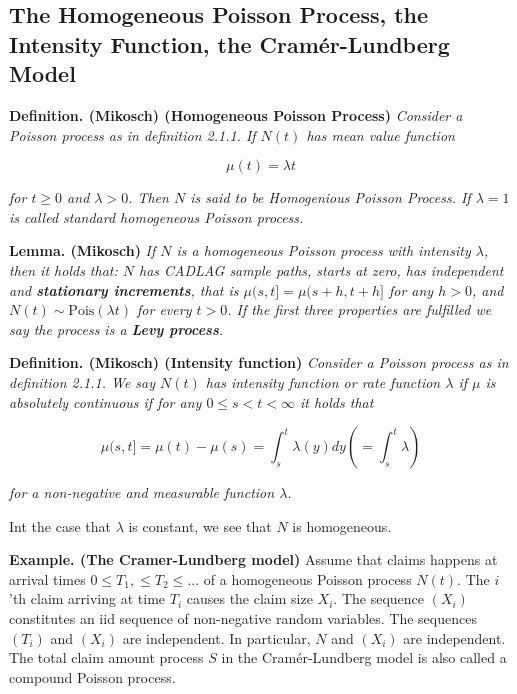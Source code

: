 \documentclass[a4paper,10pt,openany]{book}
\begin{document}
\hypertarget{the-homogeneous-poisson-process-the-intensity-function-the-cramuxe9r-lundberg-model}{%
\subsection{The Homogeneous Poisson Process, the Intensity Function, the Cramér-Lundberg Model}\label{the-homogeneous-poisson-process-the-intensity-function-the-cramuxe9r-lundberg-model}}

\textbf{Definition. (Mikosch) (Homogeneous Poisson Process)} \emph{Consider a Poisson process as in definition 2.1.1. If \(N(t)\) has mean value function}

\[
\mu(t)=\lambda t
\]

\emph{for \(t\ge 0\) and \(\lambda >0\). Then \(N\) is said to be Homogenious Poisson Process. If \(\lambda=1\) is called standard homogeneous Poisson process.}

\textbf{Lemma. (Mikosch)} \emph{If \(N\) is a homogeneous Poisson process with intensity \(\lambda\), then it holds that: \(N\) has CADLAG sample paths, starts at zero, has independent and \textbf{stationary increments}, that is \(\mu(s,t]=\mu(s+h,t+h]\) for any \(h>0\), and \(N(t)\sim \text{Pois}(\lambda t)\) for every \(t>0\). If the first three properties are fulfilled we say the process is a \textbf{Levy process}.}

\textbf{Definition. (Mikosch) (Intensity function)} \emph{Consider a Poisson process as in definition 2.1.1. We say \(N(t)\) has intensity function or rate function \(\lambda\) if \(\mu\) is absolutely continuous if for any \(0\le s <t<\infty\) it holds that}

\[
\mu(s,t]=\mu(t)-\mu(s)=\int^t_s\lambda(y) dy\left(=\int_s^t \lambda\right)
\]

\emph{for a non-negative and measurable function \(\lambda\).}

Int the case that \(\lambda\) is constant, we see that \(N\) is homogeneous.

\textbf{Example. (The Cramer-Lundberg model)} Assume that claims happens at arrival times \(0\le T_1,\le T_2\le ...\) of a homogeneous Poisson process \(N(t)\). The \(i\)'th claim arriving at time \(T_i\) causes the claim size \(X_i\). The sequence \((X_i)\) constitutes an iid sequence of non-negative random variables. The sequences \((T_i)\) and \((X_i)\) are independent. In particular, \(N\) and \((X_i)\) are independent. The total claim amount process \(S\) in the Cramér-Lundberg model is also called a compound Poisson process.
\end{document}

